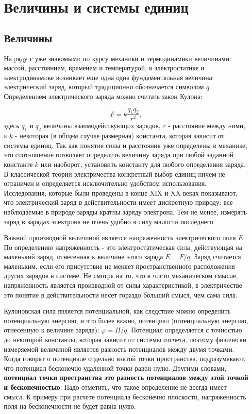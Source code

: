 \section{Величины и системы единиц}

\subsection{Величины}

На ряду с уже знакомыми по курсу механики и термодинамики величинами: массой, расстоянием, временем и температурой, в электростатике и электродинамике возникает еще одна одна фундаментальная величина: электрический заряд, который традиционно обозначается символом $q$. Определением электрического заряда можно считать закон Кулона:

\begin{equation}
\label{eq:coulomb}
	F = k \frac{q_1 q_2}{r^2},
\end{equation}
здесь $q_1$ и $q_2$ величины взаимодействующих зарядов, $r$ - расстояние между ними, а $k$ - некоторая (в общем случае размерная) константа, которая зависит от системы единиц. Так как понятие силы и расстояния уже определены в механике, это соотношение позволяет определить величину заряда при любой заданной константе $k$ или наоборот, установить константу для любого определения заряда. В классической теории электричества конкретный выбор единиц ничем не ограничен и определяется исключительно удобством использования. Исследования, которые были проведены в конце XIX и XX веках показывают, что электрический заряд в действительности имеет дискретную природу: все наблюдаемые в природе заряды кратны заряду электрона. Тем не менее, измерять заряд в зарядах электрона не очень удобно в силу малости последнего.

Важной производной величиной является напряженность электрического поля $E$. По определению напряженность - это электростатическая сила, действующая на маленький заряд, отнесенная к величине этого заряда $E = F/q$. Заряд считается маленьким, если его присутствие не меняет пространственного расположения других зарядов в системе. Не смотря на то, что в чисто механическом смысле, напряженность является производной от силы характеристикой, в электричестве это понятие в действительности несет гораздо больший смысл, чем сама сила.

Кулоновская сила является потенциальной, как следствие можно определить потенциальную энергию, и что более важно, потенциал (потенциальную энергию, отнесенную к величине заряда): $\varphi = \Pi/q$. Потенциал определяется с точностью до некоторой константы, которая зависит от системы отсчета, поэтому физически измеряемой величиной является разность потенциалов между двумя точками. Когда говорят о потенциале отдельно взятой точки пространства, подразумевают, что потенциал бесконечно удаленной точки равен нулю. Другими словами, \textbf{потенциал точки пространства это разность потенциалов между этой точкой и бесконечностью}. Надо отметить, что такое определение не всегда имеет смысл. К примеру при расчете потенциала бесконечно плоскости, напряженность поля на бесконечности не будет равна нулю.

